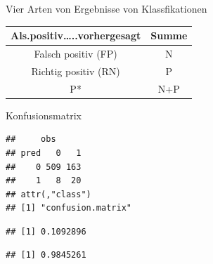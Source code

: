 \begin{frame}{Vier Arten von Ergebnisse von Klassfikationen}
\begin{longtable}[]{@{}cc@{}}
\toprule
\begin{minipage}[b]{0.41\columnwidth}\centering\strut
Als.positiv\ldots{}..vorhergesagt\strut
\end{minipage} & \begin{minipage}[b]{0.09\columnwidth}\centering\strut
Summe\strut
\end{minipage}\tabularnewline
\midrule
\endhead
\begin{minipage}[t]{0.41\columnwidth}\centering\strut
Falsch positiv (FP)\strut
\end{minipage} & \begin{minipage}[t]{0.09\columnwidth}\centering\strut
N\strut
\end{minipage}\tabularnewline
\begin{minipage}[t]{0.41\columnwidth}\centering\strut
Richtig positiv (RN)\strut
\end{minipage} & \begin{minipage}[t]{0.09\columnwidth}\centering\strut
P\strut
\end{minipage}\tabularnewline
\begin{minipage}[t]{0.41\columnwidth}\centering\strut
P*\strut
\end{minipage} & \begin{minipage}[t]{0.09\columnwidth}\centering\strut
N+P\strut
\end{minipage}\tabularnewline
\bottomrule
\end{longtable}

\end{frame}

\begin{frame}[fragile]{Konfusionsmatrix}

\begin{verbatim}
##     obs
## pred   0   1
##    0 509 163
##    1   8  20
## attr(,"class")
## [1] "confusion.matrix"
\end{verbatim}

\begin{verbatim}
## [1] 0.1092896
\end{verbatim}

\begin{verbatim}
## [1] 0.9845261
\end{verbatim}

\end{frame}

